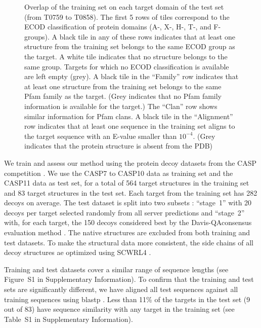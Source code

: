 \documentclass{bioinfo}
\begin{document}
\begin{figure}[t]
    \vspace{-10pt}
    \caption{Overlap of the training set on each target domain of the
    test set (from T0759 to T0858). The first 5 rows of tiles
    correspond to the ECOD classification of protein domains (A-, X-,
    H-, T-, and F-groups). A black tile in any of these rows indicates
    that at least one structure from the training set belongs to the
    same ECOD group as the target. A white tile indicates that no
    structure belongs to the same group. Targets for which no ECOD
    classification is available are left empty (grey).
    A black tile in the ``Family'' row indicates that at least one
    structure from the training set belongs to the same Pfam family as
    the target. (Grey indicates that no Pfam family information is
    available for the target.) The ``Clan'' row shows similar
    information for Pfam clans. A black tile in the ``Alignment'' row
    indicates that at least one sequence in the training set aligns to
    the target sequence with an E-value smaller than $10^{-4}$. (Grey
    indicates that the protein structure is absent from the PDB)}
    \label{Fig:summaryTable}
\end{figure}

We train and assess our method using the protein decoy datasets from
the CASP competition \citep{moult2014critical}.  We use the CASP7 to
CASP10 data as training set and the CASP11 data as test set, for a
total of 564 target structures in the training set and 83 target
structures in the test set. Each target from the training set has 282
decoys on average.
The test dataset is split into two subsets \citep{kryshtafovych2015}:
``stage~1'' with 20 decoys per target selected randomly from all
server predictions and ``stage~2'' with, for each target, the 150 decoys
considered best by the Davis-QAconsensus evaluation
method \citep{kryshtafovych2015}.
The native structures are excluded from both training 
and test datasets. To make the
structural data more consistent, the side chains of all decoy
structures ae optimized using SCWRL4
\citep{krivov2009improved}.

Training and test datasets cover a similar range of sequence
lengths (see Figure~S1 in Supplementary Information). To confirm that the
training and test sets are significantly different, we have aligned
all test sequences against all training sequences using
blastp \citep{altschul1990basic}.  Less than 11\% of the targets in the
test set (9 out of 83) have sequence similarity with any target in the
training set (see Table~S1 in Supplementary Information).
\end{document}
